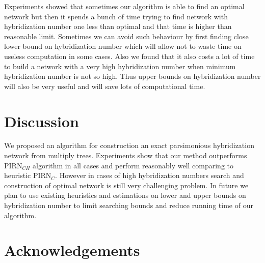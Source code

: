 \documentclass[runningheads, envcountsame, a4paper]{llncs}
\begin{document}
Experiments showed that sometimes our algorithm is able to find an optimal network but then it spends a bunch of time trying to find network 
with hybridization number one less than optimal and that time is higher than reasonable limit. Sometimes we can avoid such behaviour by 
first finding close lower bound on hybridization number which will allow not to waste time on useless computation in some cases. Also we found 
that it also costs a lot of time to build a network with a very high hybridization number when minimum hybridization number is not so high. 
Thus upper bounds on hybridization number will also be very useful and will save lots of computational time.

\section{Discussion}

We proposed an algorithm for construction an exact parsimonious hybridization network from multiply trees. Experiments show that our method 
outperforms PIRN$_{CH}$ algorithm in all cases and perform reasonably well comparing to heuristic PIRN$_C$. However in cases of high 
hybridization numbers search and construction of optimal network  is still very challenging problem. In future we plan to use existing 
heuristics and estimations on lower and upper bounds on hybridization number to limit searching bounds and reduce running time of our algorithm.

\section*{Acknowledgements}



\clearpage
\end{document}
